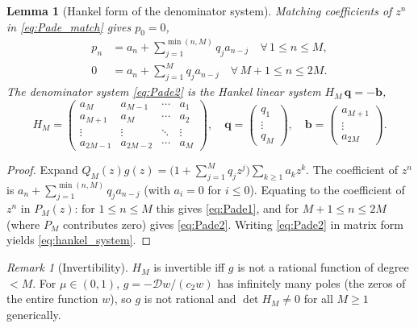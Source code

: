 \documentclass[12pt,a4paper]{amsart}
\theoremstyle{plain}
\newtheorem{lemma}[theorem]{Lemma}
\theoremstyle{definition}
\theoremstyle{remark}
\newtheorem{remark}[theorem]{Remark}
\begin{document}
\begin{lemma}[Hankel form of the denominator system]\label{lem:hankel}
Matching coefficients of $z^n$ in \eqref{eq:Pade_match} gives $p_0=0$,
\begin{align}
  p_n &= a_n+\sum_{j=1}^{\min(n,M)}q_j a_{n-j}
  \quad\forall\,1\le n\le M,
  \label{eq:Pade1}\\
  0 &= a_n+\sum_{j=1}^M q_j a_{n-j}
  \quad\forall\,M+1\le n\le 2M.
  \label{eq:Pade2}
\end{align}
The denominator system \eqref{eq:Pade2} is the Hankel linear system
$H_M\,\mathbf{q}=-\mathbf{b}$,
\begin{equation}\label{eq:hankel_system}
  H_M=\begin{pmatrix}a_M&a_{M-1}&\cdots&a_1\\
                     a_{M+1}&a_M&\cdots&a_2\\
                     \vdots&\vdots&\ddots&\vdots\\
                     a_{2M-1}&a_{2M-2}&\cdots&a_M\end{pmatrix},\quad
  \mathbf{q}=\begin{pmatrix}q_1\\\vdots\\q_M\end{pmatrix},\quad
  \mathbf{b}=\begin{pmatrix}a_{M+1}\\\vdots\\a_{2M}\end{pmatrix}.
\end{equation}
\end{lemma}

\begin{proof}
Expand $Q_M(z)g(z)=\bigl(1+\sum_{j=1}^M q_j z^j\bigr)\sum_{k\ge 1}a_k z^k$.
The coefficient of $z^n$ is $a_n+\sum_{j=1}^{\min(n,M)}q_j a_{n-j}$ (with
$a_i=0$ for $i\le 0$). Equating to the coefficient of $z^n$ in $P_M(z)$:
for $1\le n\le M$ this gives \eqref{eq:Pade1}, and for $M+1\le n\le 2M$
(where $P_M$ contributes zero) gives \eqref{eq:Pade2}. Writing \eqref{eq:Pade2}
in matrix form yields \eqref{eq:hankel_system}.
\end{proof}

\begin{remark}[Invertibility]\label{rem:HM_invertible}
$H_M$ is invertible iff $g$ is not a rational function of degree $<M$.
For $\mu\in(0,1)$, $g=-\mathcal{D}w/(c_2 w)$ has infinitely many poles
(the zeros of the entire function $w$), so $g$ is not rational and
$\det H_M\ne 0$ for all $M\ge 1$ generically.
\end{remark}
\end{document}
